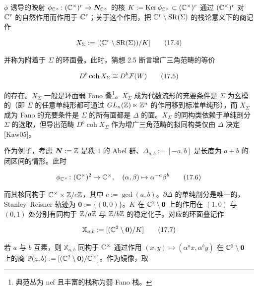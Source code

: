 
$\phi$ 诱导的映射 $\phi_{\mathbb{C}^{\times}}\colon(\mathbb{C}^{\times})^r\to\bm{N}_{\mathbb{C}^{\times}}$ 的核 $K := \operatorname{Ker}\phi_{\mathbb{C}^{\times}}\subset(\mathbb{C}^{\times})^r$ 通过 $(\mathbb{C}^{\times})^r$ 对 $\mathbb{C}^r$ 的自然作用而作用于 $\mathbb{C}^r$；关于这个作用，把 $\mathbb{C}^r\setminus\mathrm{SR}(\Sigma)$ 的栈论意义下的商记作

\begin{equation}
  X_{\Sigma} := [(\mathbb{C}^r\setminus\mathrm{SR}(\Sigma))/K] \tag{17.4}
\end{equation}

并称为附着于 $\Sigma$ 的环面叠。此时，猜想 2.5 断言增广三角范畴的等价

\begin{equation}
  D^b\operatorname{coh}X_{\Sigma} \cong D^b\mathcal{F}(W) \tag{17.5}
\end{equation}

的存在。$X_{\Sigma}$ 一般是环面弱 Fano 叠\footnote{典范丛为 nef 且丰富的栈称为弱 Fano 栈。}。$X_{\Sigma}$ 成为代数流形的充要条件是 $\Sigma$ 为幺模的（即 $\Sigma$ 的任意单纯形都可通过 $GL_n(\mathbb{Z})\ltimes\mathbb{Z}^n$ 的作用移到标准单纯形），而 $X_{\Sigma}$ 成为 Fano 的充要条件是 $\Sigma$ 的所有面都是 $\Delta$ 的面。$X_{\Sigma}$ 的同构类依赖于单纯剖分 $\Sigma$ 的选取，但导出范畴 $D^b\operatorname{coh}X_{\Sigma}$ 作为增广三角范畴的拟同构类仅由 $\Delta$ 决定 [Kaw05]。

作为例子，考虑 $\bm{N}:=\mathbb{Z}$ 是秩 $1$ 的 Abel 群、$\Delta_{a,b} := [-a,b]$ 是长度为 $a+b$ 的闭区间的情形。此时

\begin{equation}
  \phi_{\mathbb{C}^{\times}}\colon(\mathbb{C}^{\times})^2\to\mathbb{C}^{\times},\quad
  (\alpha,\beta)\mapsto\alpha^{-a}\beta^{b} \tag{17.6}
\end{equation}

而其核同构于 $\mathbb{C}^{\times}\times\mathbb{Z}/c\mathbb{Z}$，其中 $c := \gcd(a,b)$。$\partial\Delta$ 的单纯剖分是唯一的，Stanley–Reisner 轨迹为 $\bm{0} := \{(0,0)\}$。$K$ 在 $\mathbb{C}^2\setminus\bm{0}$ 上的作用在 $(1,0)$ 与 $(0,1)$ 处分别有同构于 $\mathbb{Z}/a\mathbb{Z}$ 与 $\mathbb{Z}/b\mathbb{Z}$ 的稳定化子。对应的环面叠记作

\begin{equation}
  \mathbb{X}_{a,b} := [(\mathbb{C}^2\setminus\bm{0})/K] \tag{17.7}
\end{equation}

若 $a$ 与 $b$ 互素，则 $\mathbb{X}_{a,b}$ 同构于 $\mathbb{C}^{\times}$ 通过作用 $(x,y)\mapsto(\alpha^a x,\alpha^b y)$ 在 $\mathbb{C}^2\setminus\bm{0}$ 上的商 $\mathbb{P}(a,b) := [(\mathbb{C}^2\setminus\bm{0})/\mathbb{C}^{\times}]$。作为镜像，取

